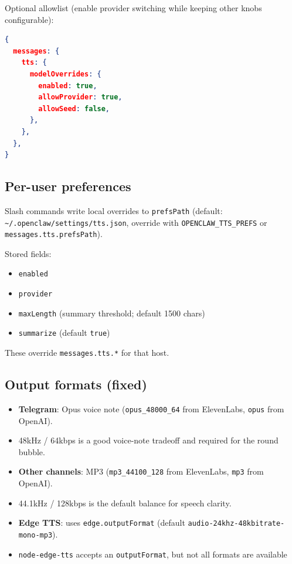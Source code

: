 Optional allowlist (enable provider switching while keeping other knobs configurable):

\begin{lstlisting}[language=json]
{
  messages: {
    tts: {
      modelOverrides: {
        enabled: true,
        allowProvider: true,
        allowSeed: false,
      },
    },
  },
}
\end{lstlisting}


\subsection{Per-user preferences}


Slash commands write local overrides to \texttt{prefsPath} (default:
\texttt{\textasciitilde{}/.openclaw/settings/tts.json}, override with \texttt{OPENCLAW\_TTS\_PREFS} or
\texttt{messages.tts.prefsPath}).

Stored fields:

\begin{itemize}
  \item \texttt{enabled}
  \item \texttt{provider}
  \item \texttt{maxLength} (summary threshold; default 1500 chars)
  \item \texttt{summarize} (default \texttt{true})
\end{itemize}


These override \texttt{messages.tts.*} for that host.

\subsection{Output formats (fixed)}


\begin{itemize}
  \item \textbf{Telegram}: Opus voice note (\texttt{opus\_48000\_64} from ElevenLabs, \texttt{opus} from OpenAI).
  \item 48kHz / 64kbps is a good voice-note tradeoff and required for the round bubble.
  \item \textbf{Other channels}: MP3 (\texttt{mp3\_44100\_128} from ElevenLabs, \texttt{mp3} from OpenAI).
  \item 44.1kHz / 128kbps is the default balance for speech clarity.
  \item \textbf{Edge TTS}: uses \texttt{edge.outputFormat} (default \texttt{audio-24khz-48kbitrate-mono-mp3}).
  \item \texttt{node-edge-tts} accepts an \texttt{outputFormat}, but not all formats are available
\end{itemize}

